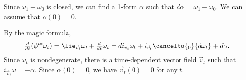 Since $\omega_1-\omega_0$ is closed, we can find a 1-form $\alpha$ such that
$d\alpha=\omega_1-\omega_0$.
We can assume that $\alpha(0)=0$.

By the magic formula,
\[\tfrac{d}{dt}(\phi^{t*}\omega_t)
=
\Lie_{\vec v_t}\omega_t+\tfrac{d}{dt}\omega_t
=
di_{\vec v_t}\omega_t+i_{\vec v_t}\cancelto{{}_0}{d\omega_t}+d\alpha.\]
Since $\omega_t$ is nondegenerate, there is a time-dependent vector field $\vec v_t$ such that $i_{\vec v_t}\omega=-\alpha$.
Since $\alpha(0)=0$, we have $\vec v_t(0)=0$ for any $t$.
\qeds

